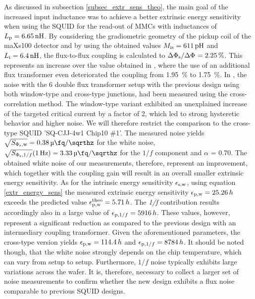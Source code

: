 As discussed in subsection \ref{subsec_extr_sens_theo}, the main goal of the increased input inductance was to achieve a better extrinsic energy sensitivity when using the SQUID for the read-out of MMCs with inductances of $L_{\rm p}=\qty{6.65}{\nH}$.
By considering the gradiometric geometry of the pickup coil of the maXs100 detector and by using the obtained values $M_{\rm is}=\qty{611}{\pH}$ and  $L_{\rm i}=\qty{6.4}{\nH}$, the flux-to-flux coupling is calculated to $\Delta\Phi_{\rm s}/\Delta\Phi_{\rm }=\qty{2.25}{\percent}$. This represents an increase over the value obtained in \cite{Bauer2022}, where the use of an additional flux transformer even deteriorated the coupling from \qty{1.95}{\percent} to \qty{1.75}{\percent}. In \cite{Bauer2022}, the noise with the \qty{6}{\nH} double flux transformer setup with the previous design using both window-type and cross-type junctions, had been measured using the cross-correlation method. The window-type variant exhibited an unexplained increase of the targeted critical current by a factor of 2, which led to strong hysteretic behavior and higher noise. We will therefore restrict the comparison to the cross-type SQUID 'SQ-CJJ-4w1 Chip10 $\#$1'. The measured noise yields $\sqrt{S_{\rm \Phi_{\rm s},w}}=\qty{0.38}{\micro\fq\per\sqrthz}$ for the white noise, $\sqrt{S_{\Phi_{\rm s},1/f}}(\qty{1}{\Hz})=\qty{3.33}{\micro\fq\per\sqrthz}$ for the $1/f$ component and $\alpha$ = 0.70. The obtained white noise of our measurements, therefore, represent an improvement, which together with the coupling gain will result in an overall smaller extrinsic energy sensitivity. As for the intrinsic energy sensitivity $\epsilon_{\rm s,w}$,  using equation \ref{extr_energy_sens} the measured extrinsic energy sensitivity $\epsilon_{\rm p,w}=25.26\, h$ exceeds the predicted value $\epsilon_{\rm p,w}^{\rm theo}=5.71\, h$. The \textit{1/f} contribution results accordingly also in a large value of $\epsilon_{{\rm p},1/f}=5916\, h$. These values, however, represent a significant reduction as compared to the previous design with an intermediary coupling transformer. Given the aforementioned parameters, the cross-type version yields $\epsilon_{\rm p,w}=114.4\, h$ and $\epsilon_{{\rm p},1/f}=8784\, h$. It should be noted though, that the white noise strongly depends on the chip temperature, which can vary from setup to setup. Furthermore, $1/f$ noise typically exhibits large variations across the wafer. It is, therefore, necessary to collect a larger set of noise measurements to confirm whether the new design exhibits a flux noise comparable to previous SQUID designs.\\

